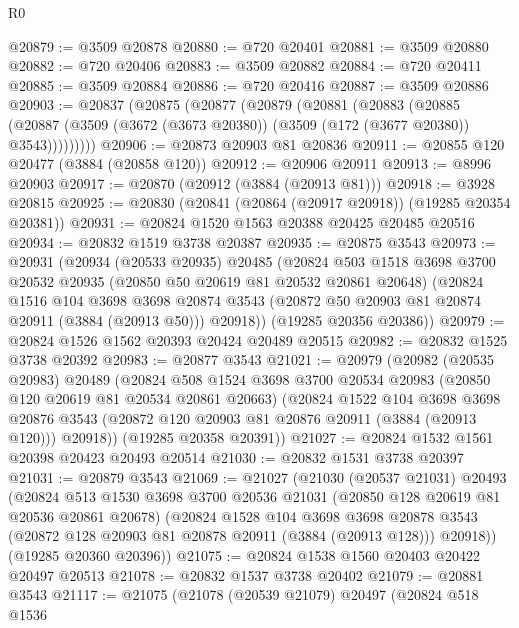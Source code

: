 \begin{lexlean}{R0}
\begin{coremodule}
@20879 := @3509 @20878
@20880 := @720 @20401
@20881 := @3509 @20880
@20882 := @720 @20406
@20883 := @3509 @20882
@20884 := @720 @20411
@20885 := @3509 @20884
@20886 := @720 @20416
@20887 := @3509 @20886
@20903 := @20837
    (@20875
      (@20877
        (@20879
          (@20881
            (@20883
              (@20885
                (@20887 (@3509 (@3672 (@3673 @20380)) (@3509 (@172 (@3677 @20380)) @3543)))))))))
@20906 := @20873 @20903 @81 @20836
@20911 := @20855 @120 @20477 (@3884 (@20858 @120))
@20912 := @20906 @20911
@20913 := @8996 @20903
@20917 := @20870 (@20912 (@3884 (@20913 @81)))
@20918 := @3928 @20815
@20925 := @20830 (@20841 (@20864 (@20917 @20918)) (@19285 @20354 @20381))
@20931 := @20824 @1520 @1563 @20388 @20425 @20485 @20516
@20934 := @20832 @1519 @3738 @20387
@20935 := @20875 @3543
@20973 := @20931
    (@20934
      (@20533 @20935)
      @20485
      (@20824
        @503
        @1518
        @3698
        @3700
        @20532
        @20935
        (@20850 @50 @20619 @81 @20532 @20861 @20648)
        (@20824
          @1516
          @104
          @3698
          @3698
          @20874
          @3543
          (@20872 @50 @20903 @81 @20874 @20911 (@3884 (@20913 @50)))
          @20918))
      (@19285 @20356 @20386))
@20979 := @20824 @1526 @1562 @20393 @20424 @20489 @20515
@20982 := @20832 @1525 @3738 @20392
@20983 := @20877 @3543
@21021 := @20979
    (@20982
      (@20535 @20983)
      @20489
      (@20824
        @508
        @1524
        @3698
        @3700
        @20534
        @20983
        (@20850 @120 @20619 @81 @20534 @20861 @20663)
        (@20824
          @1522
          @104
          @3698
          @3698
          @20876
          @3543
          (@20872 @120 @20903 @81 @20876 @20911 (@3884 (@20913 @120)))
          @20918))
      (@19285 @20358 @20391))
@21027 := @20824 @1532 @1561 @20398 @20423 @20493 @20514
@21030 := @20832 @1531 @3738 @20397
@21031 := @20879 @3543
@21069 := @21027
    (@21030
      (@20537 @21031)
      @20493
      (@20824
        @513
        @1530
        @3698
        @3700
        @20536
        @21031
        (@20850 @128 @20619 @81 @20536 @20861 @20678)
        (@20824
          @1528
          @104
          @3698
          @3698
          @20878
          @3543
          (@20872 @128 @20903 @81 @20878 @20911 (@3884 (@20913 @128)))
          @20918))
      (@19285 @20360 @20396))
@21075 := @20824 @1538 @1560 @20403 @20422 @20497 @20513
@21078 := @20832 @1537 @3738 @20402
@21079 := @20881 @3543
@21117 := @21075
    (@21078
      (@20539 @21079)
      @20497
      (@20824
        @518
        @1536

\end{coremodule}
\end{lexlean}
